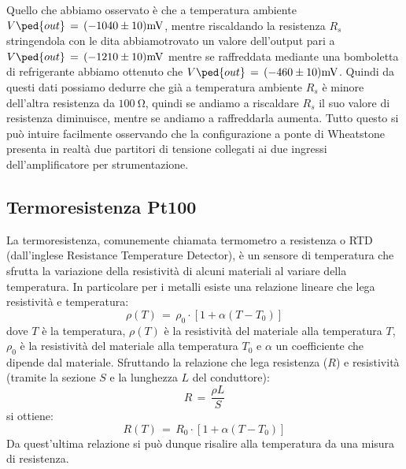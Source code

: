 Quello che abbiamo osservato è che a temperatura ambiente $V\ped{out}\,=\,(-1040\pm10)\si{\milli\volt}$, mentre riscaldando la resistenza $R_s$ stringendola con le dita abbiamotrovato un valore dell'output pari a $V\ped{out}\,=\,(-1210\pm10)\si{\milli\volt}$ mentre se raffreddata mediante una bomboletta di refrigerante abbiamo ottenuto che $V\ped{out}\,=\,(-460\pm10)\si{\milli\volt}$. Quindi da questi dati possiamo dedurre che già a temperatura ambiente $R_s$ è minore dell'altra resistenza da $\SI{100}{\ohm}$, quindi se andiamo a riscaldare $R_s$ il suo valore di resistenza diminuisce, mentre se andiamo a raffreddarla aumenta. Tutto questo si può intuire facilmente osservando che la configurazione a ponte di Wheatstone presenta in realtà due partitori di tensione collegati ai due ingressi dell'amplificatore per strumentazione.

\subsection*{Termoresistenza Pt100}

La termoresistenza, comunemente chiamata termometro a resistenza o RTD (dall'inglese Resistance Temperature Detector), è un sensore di temperatura che sfrutta la variazione della resistività di alcuni materiali al variare della temperatura. In particolare per i metalli esiste una relazione lineare che lega resistività e temperatura:
\begin{equation}
    \rho (T)\,=\,\rho_0\cdot[1 + \alpha(T - T_0)]
\end{equation}
dove $T$ è la temperatura, $\rho (T)$ è la resistività del materiale alla temperatura $T$, $\rho_0$ è la resistività del materiale alla temperatura $T_0$ e $\alpha$ un coefficiente che dipende dal materiale.
Sfruttando la relazione che lega resistenza ($R$) e resistività (tramite la sezione $S$ e la lunghezza $L$ del conduttore):
\begin{equation}
    R\,=\,\frac{\rho L}{S} 
\end{equation}
si ottiene:
\begin{equation}
    R(T)\,=\,R_0 \cdot [1 + \alpha(T - T_0)]
\end{equation}
Da quest'ultima relazione si può dunque risalire alla temperatura da una misura di resistenza.


